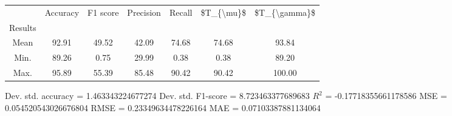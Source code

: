 \begin{tabular}{|c|c|c|c|c|c|c|}
\toprule
{} &  Accuracy &  F1 score &  Precision &  Recall &  \$T\_\{\textbackslash mu\}\$ &  \$T\_\{\textbackslash gamma\}\$ \\
Results &           &           &            &         &            &               \\
\hline
Mean    &     92.91 &     49.52 &      42.09 &   74.68 &      74.68 &         93.84 \\
Min.    &     89.26 &      0.75 &      29.99 &    0.38 &       0.38 &         89.20 \\
Max.    &     95.89 &     55.39 &      85.48 &   90.42 &      90.42 &        100.00 \\
\bottomrule
\end{tabular}

 Dev. std. accuracy = 1.463343224677274
 Dev. std. F1-score = 8.723463377689683
 $R^2$ = -0.17718355661178586
 MSE = 0.054520543026676804
 RMSE = 0.23349634478226164
 MAE = 0.07103387881134064